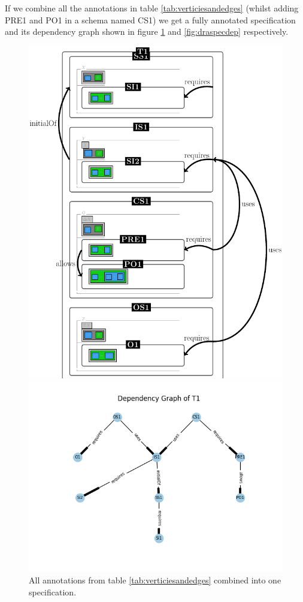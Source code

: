 If we combine all the annotations in table \ref{tab:verticiesandedges} (whilst
adding PRE1 and PO1 in a schema named CS1) we get a fully annotated
specification and its dependency graph shown in figure \ref{fig:draspec} and
\ref{fig:draspecdep} respectively.

\begin{figure}[H]
\centering
\begin{minipage}{0.45\textwidth}
\centering
\includegraphics[scale=0.3]{Figures/Formalising/draspec.png}
\caption{All annotations from table \ref{tab:verticiesandedges} combined into one specification.  \label{fig:draspec}}
\end{minipage}\hfill
\begin{minipage}{0.45\textwidth}
\centering
\includegraphics[scale=0.55]{Figures/Formalising/dp_text.png}

\end{minipage}
\end{figure}
